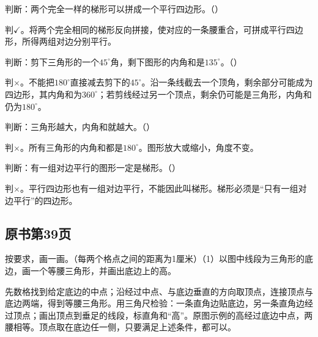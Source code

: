 判断：两个完全一样的梯形可以拼成一个平行四边形。（\hspace{1.8em}）\par
\begin{BookAnswer}
判\(\checkmark\)。将两个完全相同的梯形反向拼接，使对应的一条腰重合，可拼成平行四边形，所得两组对边分别平行。
\end{BookAnswer}

判断：剪下三角形的一个\(45^\circ\)角，剩下图形的内角和是\(135^\circ\)。（\hspace{1.8em}）\par
\begin{BookAnswer}
判\(\times\)。不能把\(180^\circ\)直接减去剪下的\(45^\circ\)。沿一条线截去一个顶角，剩余部分可能成为四边形，其内角和为\(360^\circ\)；若剪线经过另一个顶点，剩余仍可能是三角形，内角和仍为\(180^\circ\)。
\end{BookAnswer}

判断：三角形越大，内角和就越大。（\hspace{1.8em}）\par
\begin{BookAnswer}
判\(\times\)。所有三角形的内角和都是\(180^\circ\)。图形放大或缩小，角度不变。
\end{BookAnswer}

判断：有一组对边平行的图形一定是梯形。（\hspace{1.8em}）\par
\begin{BookAnswer}
判\(\times\)。平行四边形也有一组对边平行，不能因此叫梯形。梯形必须是“只有一组对边平行”的四边形。
\end{BookAnswer}



\subsection*{原书第39页}

按要求，画一画。（每两个格点之间的距离为1厘米）（1）以图中线段为三角形的底边，画一个等腰三角形，并画出底边上的高。\par
{}
\begin{BookAnswer}
先数格找到给定底边的中点；沿经过中点、与底边垂直的方向取顶点，连接顶点与底边两端，得到等腰三角形。用三角尺检验：一条直角边贴底边，另一条直角边经过顶点；画出顶点到垂足的线段，标直角和“高”。原图示例的高经过底边中点，两腰相等。顶点取在底边任一侧，只要满足上述条件，都可以。
\end{BookAnswer}

